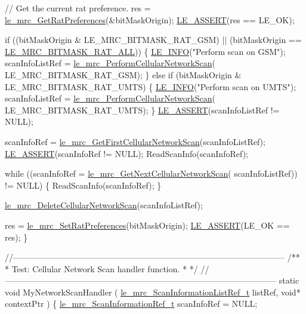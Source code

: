 \begin{DoxyCodeInclude}
{{{{{{    \textcolor{comment}{// Get the current rat preference.}
    res = \hyperlink{le__mrc__interface_8h_ae9fa8655738c63e392c8dcc862bdb1d5}{le\_mrc\_GetRatPreferences}(&bitMaskOrigin);
    \hyperlink{le__log_8h_ac0dbbef91dc0fed449d0092ff0557b39}{LE\_ASSERT}(res == LE\_OK);

    \textcolor{keywordflow}{if} ((bitMaskOrigin & LE\_MRC\_BITMASK\_RAT\_GSM) || (bitMaskOrigin == 
      \hyperlink{le__mrc__interface_8h_af643c7005da7f2466302eebdf7a29d93aa6e87ad274b7f5011413ea0e8375300b}{LE\_MRC\_BITMASK\_RAT\_ALL}))
    \{
        \hyperlink{le__log_8h_a23e6d206faa64f612045d688cdde5808}{LE\_INFO}(\textcolor{stringliteral}{"Perform scan on GSM"});
        scanInfoListRef = \hyperlink{le__mrc__interface_8h_ab4a246dd466fa8175aca0158e0cab227}{le\_mrc\_PerformCellularNetworkScan}(
      LE\_MRC\_BITMASK\_RAT\_GSM);
    \}
    \textcolor{keywordflow}{else} \textcolor{keywordflow}{if} (bitMaskOrigin & LE\_MRC\_BITMASK\_RAT\_UMTS)
    \{
        \hyperlink{le__log_8h_a23e6d206faa64f612045d688cdde5808}{LE\_INFO}(\textcolor{stringliteral}{"Perform scan on UMTS"});
        scanInfoListRef = \hyperlink{le__mrc__interface_8h_ab4a246dd466fa8175aca0158e0cab227}{le\_mrc\_PerformCellularNetworkScan}(
      LE\_MRC\_BITMASK\_RAT\_UMTS);
    \}
    \hyperlink{le__log_8h_ac0dbbef91dc0fed449d0092ff0557b39}{LE\_ASSERT}(scanInfoListRef != NULL);

    scanInfoRef = \hyperlink{le__mrc__interface_8h_ae006d053b037cec589aa85053472a2af}{le\_mrc\_GetFirstCellularNetworkScan}(scanInfoListRef);
    \hyperlink{le__log_8h_ac0dbbef91dc0fed449d0092ff0557b39}{LE\_ASSERT}(scanInfoRef != NULL);
    ReadScanInfo(scanInfoRef);

    \textcolor{keywordflow}{while} ((scanInfoRef = \hyperlink{le__mrc__interface_8h_ae0ca9f0c1c106d6ddeef784c6bb0d69b}{le\_mrc\_GetNextCellularNetworkScan}(
      scanInfoListRef)) != NULL)
    \{
        ReadScanInfo(scanInfoRef);
    \}

    \hyperlink{le__mrc__interface_8h_ac45ce335b3fa063b83bb925e67eeaeb3}{le\_mrc\_DeleteCellularNetworkScan}(scanInfoListRef);

    res = \hyperlink{le__mrc__interface_8h_a2d4abd391bc69c218538f5d8e1be4e01}{le\_mrc\_SetRatPreferences}(bitMaskOrigin);
    \hyperlink{le__log_8h_ac0dbbef91dc0fed449d0092ff0557b39}{LE\_ASSERT}(LE\_OK == res);
\}


\textcolor{comment}{//--------------------------------------------------------------------------------------------------}\textcolor{comment}{}
\textcolor{comment}{/**}
\textcolor{comment}{ * Test: Cellular Network Scan handler function.}
\textcolor{comment}{ *}
\textcolor{comment}{ */}
\textcolor{comment}{//--------------------------------------------------------------------------------------------------}
\textcolor{keyword}{static} \textcolor{keywordtype}{void} MyNetworkScanHandler
(
    \hyperlink{le__mrc__interface_8h_a25a9e79cc9078e22cec22444fd959c61}{le\_mrc\_ScanInformationListRef\_t} listRef,
    \textcolor{keywordtype}{void}* contextPtr
)
\{
    \hyperlink{le__mrc__interface_8h_a3e7fe3e0d8f10fe7853f00eb254529ea}{le\_mrc\_ScanInformationRef\_t}     scanInfoRef = NULL;

}}}}}}
\end{DoxyCodeInclude}
